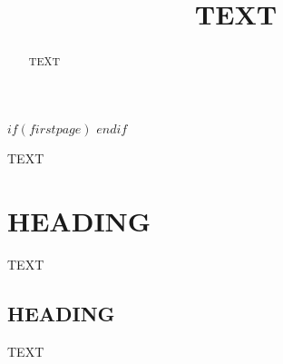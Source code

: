 \documentclass[journal abbreviation, manuscript]{copernicus}
\begin{document}
\title{TEXT}



\Author[][EMAIL]{}{} %
\Author[]{}{}
\Author[]{}{}












\received{}
\pubdiscuss{} %
\revised{}
\accepted{}
\published{}


$if(firstpage)$
$endif$

\maketitle



\begin{abstract}
TEXT
\end{abstract}




\introduction  %
TEXT


\section{HEADING}
TEXT


\subsection{HEADING}
TEXT
\end{document}
